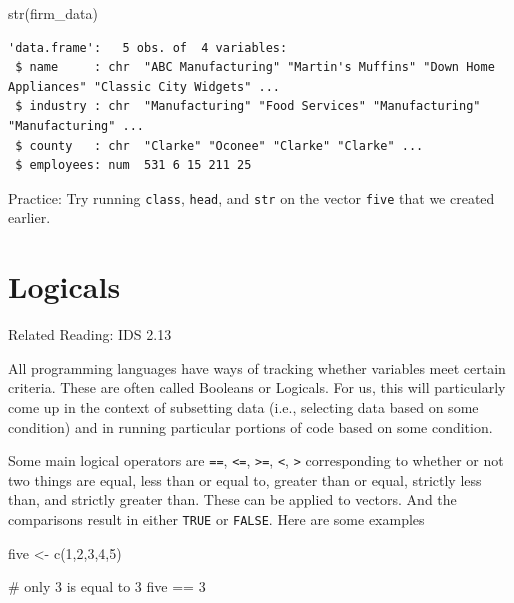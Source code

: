\documentclass[
  letterpaper,
  DIV=11,
  numbers=noendperiod]{scrreprt}
\newenvironment{Shaded}{\begin{snugshade}}{\end{snugshade}}
\newcommand{\CommentTok}[1]{\textcolor[rgb]{0.37,0.37,0.37}{#1}}
\newcommand{\DecValTok}[1]{\textcolor[rgb]{0.68,0.00,0.00}{#1}}
\newcommand{\FunctionTok}[1]{\textcolor[rgb]{0.28,0.35,0.67}{#1}}
\newcommand{\NormalTok}[1]{\textcolor[rgb]{0.00,0.23,0.31}{#1}}
\newcommand{\OtherTok}[1]{\textcolor[rgb]{0.00,0.23,0.31}{#1}}
\newcommand{\SpecialCharTok}[1]{\textcolor[rgb]{0.37,0.37,0.37}{#1}}
\begin{document}
\begin{Shaded}
\begin{Highlighting}[]
\FunctionTok{str}\NormalTok{(firm\_data)}
\end{Highlighting}
\end{Shaded}

\begin{verbatim}
'data.frame':   5 obs. of  4 variables:
 $ name     : chr  "ABC Manufacturing" "Martin's Muffins" "Down Home Appliances" "Classic City Widgets" ...
 $ industry : chr  "Manufacturing" "Food Services" "Manufacturing" "Manufacturing" ...
 $ county   : chr  "Clarke" "Oconee" "Clarke" "Clarke" ...
 $ employees: num  531 6 15 211 25
\end{verbatim}

{Practice:} Try running \texttt{class}, \texttt{head}, and \texttt{str}
on the vector \texttt{five} that we created earlier.

\section{Logicals}\label{logicals}

Related Reading: IDS 2.13

All programming languages have ways of tracking whether variables meet
certain criteria. These are often called Booleans or Logicals. For us,
this will particularly come up in the context of subsetting data (i.e.,
selecting data based on some condition) and in running particular
portions of code based on some condition.

Some main logical operators are \texttt{==}, \texttt{\textless{}=},
\texttt{\textgreater{}=}, \texttt{\textless{}}, \texttt{\textgreater{}}
corresponding to whether or not two things are equal, less than or equal
to, greater than or equal, strictly less than, and strictly greater
than. These can be applied to vectors. And the comparisons result in
either \texttt{TRUE} or \texttt{FALSE}. Here are some examples

\begin{Shaded}
\begin{Highlighting}[]
\NormalTok{five }\OtherTok{\textless{}{-}} \FunctionTok{c}\NormalTok{(}\DecValTok{1}\NormalTok{,}\DecValTok{2}\NormalTok{,}\DecValTok{3}\NormalTok{,}\DecValTok{4}\NormalTok{,}\DecValTok{5}\NormalTok{)}

\CommentTok{\# only 3 is equal to 3}
\NormalTok{five }\SpecialCharTok{==} \DecValTok{3}
\end{Highlighting}
\end{Shaded}
\end{document}
